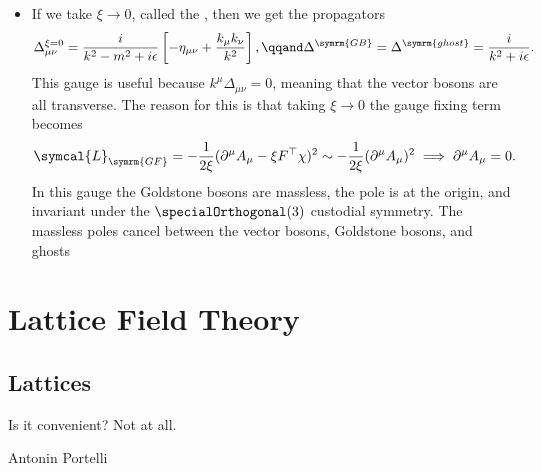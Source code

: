 \documentclass[fleqn]{NotesClass}
\newcommand{\lagrangianDensity}{\symcal{L}}
\newcommand{\bare}{\symrm{B}}
\newcommand{\minkowskiMetric}{\eta}
\newcommand{\trans}{\top}
\begin{document}
\begin{itemize}
        \item If we take \(\xi \to 0\), called the , then we get the propagators
        \begin{equation}
            \Delta_{\mu\nu}^{\xi = 0} = \frac{i}{k^2 - m^2 + i\epsilon} \left[ -\minkowskiMetric_{\mu\nu} + \frac{k_\mu k_\nu}{k^2} \right], \qqand \Delta^{\symrm{GB}} = \Delta^{\symrm{ghost}} = \frac{i}{k^2 + i\epsilon}.
        \end{equation}
        This gauge is useful because \(k^\mu \Delta_{\mu\nu} = 0\), meaning that the vector bosons are all transverse.
        The reason for this is that taking \(\xi \to 0\) the gauge fixing term becomes
        \begin{equation}
            \lagrangianDensity_{\symrm{GF}} = -\frac{1}{2\xi}(\partial^\mu A_\mu - \xi F^{\trans}\chi)^2 \sim -\frac{1}{2\xi}(\partial^\mu A_\mu)^2 \implies \partial^\mu A_\mu = 0.
        \end{equation}
        In this gauge the Goldstone bosons are massless, the pole is at the origin, and invariant under the \(\specialOrthogonal(3)\) custodial symmetry.
        The massless poles cancel between the vector bosons, Goldstone bosons, and ghosts
    \end{itemize}
    
    
    
    
    
    
    
    
    
    
    \renewcommand{\bare}{0}
    
    
    
    
    
    
    
    
    
    
    
    
    
    \part{Lattice Field Theory}
    \chapter{Lattices}
    \epigraph{Is it convenient? Not at all.}{Antonin Portelli}
\end{document}
